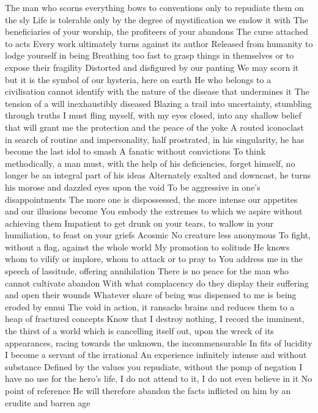 \documentclass{article}
\begin{document}
\iffalse
The man who scorns everything bows to conventions only to repudiate them on the sly
Life is tolerable only by the degree of mystification we endow it with
The beneficiaries of your worship, the profiteers of your abandons
The curse attached to acts
Every work ultimately turns against its author
Released from humanity to lodge yourself in being
Breathing too fast to grasp things in themselves or to expose their fragility
Distorted and disfigured by our panting
We may scorn it but it is the symbol of our hysteria, here on earth
He who belongs to a civilisation cannot identify with the nature of the disease that undermines it
The tension of a will inexhaustibly diseased
Blazing a trail into uncertainty, stumbling through truths
I must fling myself, with my eyes closed, into any shallow belief that will grant me the protection and the peace of the yoke
A routed iconoclast in search of routine and impersonality, half prostrated, in his singularity, he has become the last idol to smash
A fanatic without convictions
To think methodically, a man must, with the help of his deficiencies, forget himself, no longer be an integral part of his ideas
Alternately exalted and downcast, he turns his morose and dazzled eyes upon the void
To be aggressive in one's disappointments
The more one is dispossessed, the more intense our appetites and our illusions become
You embody the extremes to which we aspire without achieving them
Impatient to get drunk on your tears, to wallow in your humiliation, to feast on your griefs
Acosmic
No creature less anonymous
To fight, without a flag, against the whole world
My promotion to solitude
He knows whom to vilify or implore, whom to attack or to pray to
You address me in the speech of lassitude, offering annihilation
There is no peace for the man who cannot cultivate abandon
With what complacency do they display their suffering and open their wounds
Whatever share of being was dispensed to me is being eroded by ennui
The void in action, it ransacks brains and reduces them to a heap of fractured concepts
Know that I destroy nothing, I record the imminent, the thirst of a world which is cancelling itself out, upon the wreck of its appearances, racing towards the unknown, the incommensurable
In fits of lucidity I become a servant of the irrational
An experience infinitely intense and without substance
Defined by the values you repudiate, without the pomp of negation
I have no use for the hero's life, I do not attend to it, I do not even believe in it
No point of reference
He will therefore abandon the facts inflicted on him by an erudite and barren age
\end{document}
